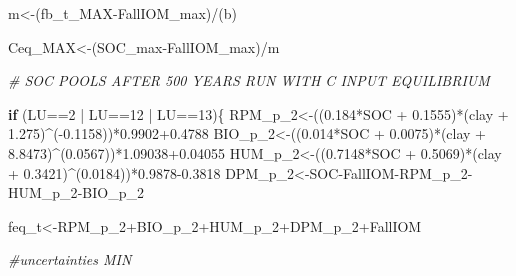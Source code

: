 \documentclass[
  10pt,
  b5paper,
]{book}
\newenvironment{Shaded}{\begin{snugshade}}{\end{snugshade}}
\newcommand{\CommentTok}[1]{\textcolor[rgb]{0.56,0.35,0.01}{\textit{#1}}}
\newcommand{\ControlFlowTok}[1]{\textcolor[rgb]{0.13,0.29,0.53}{\textbf{#1}}}
\newcommand{\DecValTok}[1]{\textcolor[rgb]{0.00,0.00,0.81}{#1}}
\newcommand{\FloatTok}[1]{\textcolor[rgb]{0.00,0.00,0.81}{#1}}
\newcommand{\NormalTok}[1]{#1}
\newcommand{\OtherTok}[1]{\textcolor[rgb]{0.56,0.35,0.01}{#1}}
\newcommand{\SpecialCharTok}[1]{\textcolor[rgb]{0.00,0.00,0.00}{#1}}
\begin{document}
\begin{Shaded}
\begin{Highlighting}[]
\NormalTok{m}\OtherTok{\textless{}{-}}\NormalTok{(fb\_t\_MAX}\SpecialCharTok{{-}}\NormalTok{FallIOM\_max)}\SpecialCharTok{/}\NormalTok{(b)}

\NormalTok{Ceq\_MAX}\OtherTok{\textless{}{-}}\NormalTok{(SOC\_max}\SpecialCharTok{{-}}\NormalTok{FallIOM\_max)}\SpecialCharTok{/}\NormalTok{m}
 
\CommentTok{\# SOC POOLS AFTER 500 YEARS RUN WITH C INPUT EQUILIBRIUM}

\ControlFlowTok{if}\NormalTok{ (LU}\SpecialCharTok{==}\DecValTok{2} \SpecialCharTok{|}\NormalTok{ LU}\SpecialCharTok{==}\DecValTok{12} \SpecialCharTok{|}\NormalTok{ LU}\SpecialCharTok{==}\DecValTok{13}\NormalTok{)\{}
\NormalTok{RPM\_p\_2}\OtherTok{\textless{}{-}}\NormalTok{((}\FloatTok{0.184}\SpecialCharTok{*}\NormalTok{SOC }\SpecialCharTok{+} \FloatTok{0.1555}\NormalTok{)}\SpecialCharTok{*}\NormalTok{(clay }\SpecialCharTok{+} \FloatTok{1.275}\NormalTok{)}\SpecialCharTok{\^{}}\NormalTok{(}\SpecialCharTok{{-}}\FloatTok{0.1158}\NormalTok{))}\SpecialCharTok{*}\FloatTok{0.9902+0.4788}
\NormalTok{BIO\_p\_2}\OtherTok{\textless{}{-}}\NormalTok{((}\FloatTok{0.014}\SpecialCharTok{*}\NormalTok{SOC }\SpecialCharTok{+} \FloatTok{0.0075}\NormalTok{)}\SpecialCharTok{*}\NormalTok{(clay }\SpecialCharTok{+} \FloatTok{8.8473}\NormalTok{)}\SpecialCharTok{\^{}}\NormalTok{(}\FloatTok{0.0567}\NormalTok{))}\SpecialCharTok{*}\FloatTok{1.09038+0.04055}
\NormalTok{HUM\_p\_2}\OtherTok{\textless{}{-}}\NormalTok{((}\FloatTok{0.7148}\SpecialCharTok{*}\NormalTok{SOC }\SpecialCharTok{+} \FloatTok{0.5069}\NormalTok{)}\SpecialCharTok{*}\NormalTok{(clay }\SpecialCharTok{+} \FloatTok{0.3421}\NormalTok{)}\SpecialCharTok{\^{}}\NormalTok{(}\FloatTok{0.0184}\NormalTok{))}\SpecialCharTok{*}\FloatTok{0.9878{-}0.3818}
\NormalTok{DPM\_p\_2}\OtherTok{\textless{}{-}}\NormalTok{SOC}\SpecialCharTok{{-}}\NormalTok{FallIOM}\SpecialCharTok{{-}}\NormalTok{RPM\_p\_2}\SpecialCharTok{{-}}\NormalTok{HUM\_p\_2}\SpecialCharTok{{-}}\NormalTok{BIO\_p\_2}

\NormalTok{feq\_t}\OtherTok{\textless{}{-}}\NormalTok{RPM\_p\_2}\SpecialCharTok{+}\NormalTok{BIO\_p\_2}\SpecialCharTok{+}\NormalTok{HUM\_p\_2}\SpecialCharTok{+}\NormalTok{DPM\_p\_2}\SpecialCharTok{+}\NormalTok{FallIOM}

\CommentTok{\#uncertainties  MIN}


\end{Highlighting}
\end{Shaded}
\end{document}
